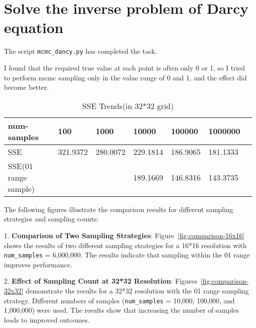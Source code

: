 \documentclass[11pt,reqno]{amsart}
\begin{document}
\section{Solve the inverse problem of Darcy equation}

The script \verb|mcmc_dancy.py| has completed the task.

I found that the required true value at each point is often only 0 or 1, so I tried to perform mcmc sampling only in the value range of 0 and 1, and the effect did become better.

\begin{table}[H]
  \begin{tabular}{|l|l|l|l|l|l|l|}
  \hline
  num-samples & 100            & 1000            & 10000       & 100000 & 1000000    \\ \hline
  SSE         & 321.9372 & 280.0072 & 229.1814 & 186.9065 & 181.1333\\ \hline
  SSE(01 range sample)         &  &  & 189.1669 & 146.8316 & 143.3735\\ \hline
  \end{tabular}
  \caption{SSE Trends(in 32*32 grid)}
\end{table}
The following figures illustrate the comparison results for different sampling strategies and sampling counts:

1. \textbf{Comparison of Two Sampling Strategies}:
   Figure~\ref{fig:comparison-16x16} shows the results of two different sampling strategies for a 16*16 resolution with \texttt{num\_samples} = 6,000,000. The results indicate that sampling within the 01 range improves performance.

2. \textbf{Effect of Sampling Count at 32*32 Resolution}:
   Figures~\ref{fig:comparison-32x32} demonstrate the results for a 32*32 resolution with the 01 range sampling strategy. Different numbers of samples (\texttt{num\_samples} = 10,000, 100,000, and 1,000,000) were used. The results show that increasing the number of samples leads to improved outcomes.
\end{document}

